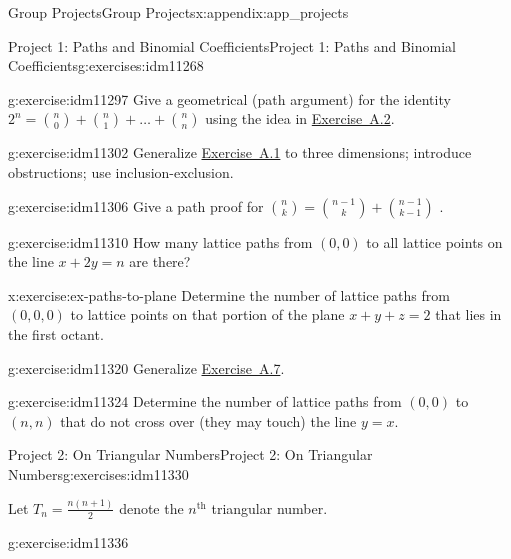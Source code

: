 \documentclass[oneside,10pt,]{book}
\numberwithin{equation}{chapter}
\begin{document}
\begin{appendixptx}{Group Projects}{}{Group Projects}{}{}{x:appendix:app_projects}
\begin{exercises-section-numberless}{Project 1: Paths and Binomial Coefficients}{}{Project 1: Paths and Binomial Coefficients}{}{}{g:exercises:idm11268}
\begin{divisionexercise}{3}{}{}{g:exercise:idm11297}
Give a geometrical (path argument) for the identity \(2^{n} =
\binom{n}{0}
+
\binom{n}{1}
+ \ldots +
\binom{n}{n}\) using the idea in \hyperlink{x:exercise:ex-paths-on-lines}{Exercise~A.2}.%
\end{divisionexercise}%
\begin{divisionexercise}{4}{}{}{g:exercise:idm11302}%
Generalize \hyperlink{x:exercise:ex-count-paths}{Exercise~A.1} to three dimensions; introduce obstructions; use inclusion-exclusion.%
\end{divisionexercise}%
\begin{divisionexercise}{5}{}{}{g:exercise:idm11306}%
Give a path proof for \(\binom{n}{k}
=
\binom{n - 1}{k}
+
\binom{n - 1}{k - 1}\) .%
\end{divisionexercise}%
\begin{divisionexercise}{6}{}{}{g:exercise:idm11310}%
How many lattice paths from \(\left( 0,0 \right)\) to all lattice points on the line \(x + 2y = n\) are there?%
\end{divisionexercise}%
\begin{divisionexercise}{7}{}{}{x:exercise:ex-paths-to-plane}%
Determine the number of lattice paths from \(\left( 0,0,0 \right)\) to lattice points on that portion of the plane \(x + y + z = 2\) that lies in the first octant.%
\end{divisionexercise}%
\begin{divisionexercise}{8}{}{}{g:exercise:idm11320}%
Generalize \hyperlink{x:exercise:ex-paths-to-plane}{Exercise~A.7}.%
\end{divisionexercise}%
\begin{divisionexercise}{9}{}{}{g:exercise:idm11324}%
Determine the number of lattice paths from \(\left( 0,0 \right)\) to \((n,n)\) that do not cross over (they may touch) the line \(y = x\).%
\end{divisionexercise}%
\end{exercises-section-numberless}
%
%
\typeout{************************************************}
\typeout{************************************************}
%
\begin{exercises-section-numberless}{Project 2: On Triangular Numbers}{}{Project 2: On Triangular Numbers}{}{}{g:exercises:idm11330}
\begin{introduction}{}%
Let \(T_{n} = \frac{n\left( n + 1 \right)}{2}\) denote the \(n^{\text{th}}\) triangular number.%
\end{introduction}%
\begin{divisionexercise}{1}{}{}{g:exercise:idm11336}%

\end{divisionexercise}
\end{exercises-section-numberless}
\end{appendixptx}
\end{document}

